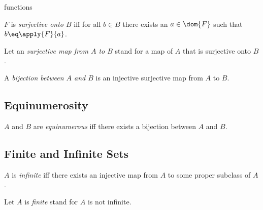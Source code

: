 \documentclass{article}
\begin{document}
\begin{smodule}{functions}
\begin{definition*}[forthel,id=SurjectionDef,printid]
  $F$ is \emph{surjective onto $B$} iff for all $b\in B$ there exists an $a\in\dom{F}$ such that $b\eq \apply{F}{a}$.

  Let an \emph{surjective map from $A$ to $B$} stand for a map of $A$ that is surjective onto $B$.
\end{definition*}

\begin{definition*}[forthel,id=BijectionDef,printid]
  A \emph{bijection between $A$ and $B$} is an injective surjective map from $A$ to $B$.
\end{definition*}

\subsection{Equinumerosity}

\begin{definition*}[forthel,id=EquinumerousDef,printid]
  $A$ and $B$ are \emph{equinumerous} iff there exists a bijection between $A$ and $B$.
\end{definition*}


\subsection{Finite and Infinite Sets}

\begin{definition*}[forthel,id=InfiniteDef,printid]
  $A$ is \emph{infinite} iff there exists an injective map from $A$ to some proper subclass of $A$.

  Let $A$ is \emph{finite} stand for $A$ is not infinite.
\end{definition*}
\end{smodule}
\end{document}

